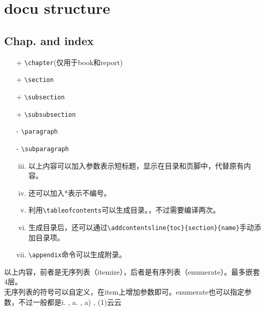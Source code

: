 \documentclass{article}
\begin{document}

\section{docu structure}
\subsection{Chap. and index}
\begin{itemize}
    \item[+] \verb|\chapter|(仅用于book和report)
    \item[+] \verb|\section|
    \item[+] \verb|\subsection|
    \item[+] \verb|\subsubsection|
    \item[-] \verb|\paragraph|
    \item[-] \verb|\subparagraph|
          \begin{enumerate}[i.]
              \setcounter{enumi}{2}
              \item 以上内容可以加入参数表示短标题，显示在目录和页脚中，代替原有内容。
              \item 还可以加入*表示不编号。
              \item 利用\verb|\tableofcontents|可以生成目录。，不过需要编译两次。
              \item 生成目录后，还可以通过\verb|\addcontentsline{toc}{section}{name}|手动添加目录项。
              \item \verb|\appendix|命令可以生成附录。
          \end{enumerate}
\end{itemize}
以上内容，前者是无序列表（itemize），后者是有序列表（enumerate）。最多嵌套4层。\\
无序列表的符号可以自定义，在item上增加参数即可。enumerate也可以指定参数，不过一般都是i. , a. , a) , (1)云云
\end{document}
